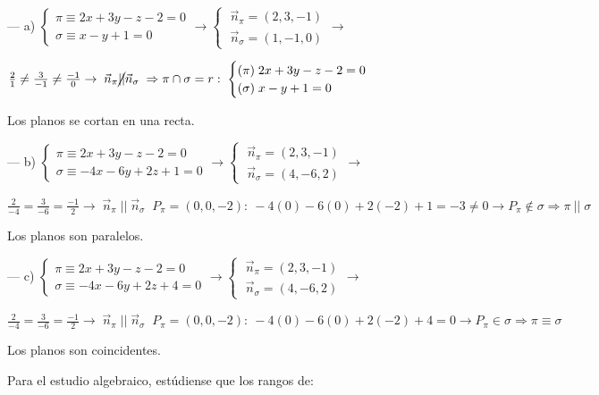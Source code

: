 \noindent --- a) $ \begin{cases} \pi \equiv 2x+3y-z-2=0 \\ \sigma \equiv x-y+1=0 \end{cases} \to \begin{cases} \; \vec n_{\pi}=(2,3,-1) \\ \; \vec n_{\sigma}=(1,-1,0) \end{cases} \to $

\noindent $\frac {2}{1} \neq \frac {3}{-1} \neq \frac{-1}{0} \to \; \vec n_{\pi} \cancel{||} \vec n_{\sigma}\; \Rightarrow  \pi \cap \sigma = r :\; \begin{cases} (\pi)\;  2x+3y-z-2=0 \\ (\sigma) \; x-y+1=0 \end{cases}$

\noindent Los planos se cortan en una recta.

\noindent --- b) $ \begin{cases} \pi \equiv 2x+3y-z-2=0 \\ \sigma \equiv -4x-6y+2z+1=0 \end{cases} \to \begin{cases} \; \vec n_{\pi}=(2,3,-1) \\ \; \vec n_{\sigma}=(4,-6,2) \end{cases} \to $

\noindent $\frac {2}{-4} = \frac {3}{-6} = \frac{-1}{2} \to \; \vec n_{\pi} \;||\; \vec n_{\sigma}\; \; P_{\pi}=(0,0,-2):\: -4(0)-6(0)+2(-2)+1=-3\neq 0 \to P_{\pi} \notin  \sigma \Rightarrow \pi\:||\; \sigma$

\noindent Los planos son paralelos.

\noindent --- c) $ \begin{cases} \pi \equiv 2x+3y-z-2=0 \\ \sigma \equiv -4x-6y+2z+4=0 \end{cases} \to \begin{cases} \; \vec n_{\pi}=(2,3,-1) \\ \; \vec n_{\sigma}=(4,-6,2) \end{cases} \to $

\noindent $\frac {2}{-4} = \frac {3}{-6} = \frac{-1}{2} \to \; \vec n_{\pi} \;||\; \vec n_{\sigma}\; \; P_{\pi}=(0,0,-2):\: -4(0)-6(0)+2(-2)+4= 0 \to P_{\pi} \in  \sigma \Rightarrow \pi \equiv \sigma$

\noindent Los planos son coincidentes.

\noindent \textcolor{gris}{Para el estudio algebraico, estúdiense que los rangos de:}

